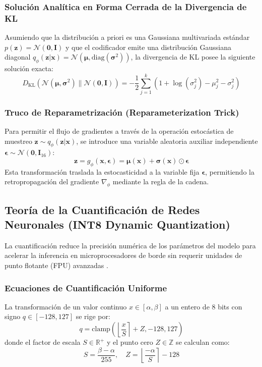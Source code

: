 \subsubsection{Solución Analítica en Forma Cerrada de la Divergencia de KL}
Asumiendo que la distribución a priori es una Gaussiana multivariada estándar $p(\mathbf{z}) = \mathcal{N}(\mathbf{0}, \mathbf{I})$ y que el codificador emite una distribución Gaussiana diagonal $q_\phi(\mathbf{z}|\mathbf{x}) = \mathcal{N}(\boldsymbol{\mu}, \text{diag}(\boldsymbol{\sigma}^2))$, la divergencia de KL posee la siguiente solución exacta:
\begin{equation}
D_{\text{KL}}\left( \mathcal{N}(\boldsymbol{\mu}, \boldsymbol{\sigma}^2) \parallel \mathcal{N}(\mathbf{0}, \mathbf{I}) \right) = -\frac{1}{2} \sum_{j=1}^k \left( 1 + \log(\sigma_j^2) - \mu_j^2 - \sigma_j^2 \right)
\end{equation}

\subsubsection{Truco de Reparametrización (Reparameterization Trick)}
Para permitir el flujo de gradientes a través de la operación estocástica de muestreo $\mathbf{z} \sim q_\phi(\mathbf{z}|\mathbf{x})$, se introduce una variable aleatoria auxiliar independiente $\boldsymbol{\epsilon} \sim \mathcal{N}(\mathbf{0}, \mathbf{I}_{16})$:
\begin{equation}
\mathbf{z} = g_\phi(\mathbf{x}, \boldsymbol{\epsilon}) = \boldsymbol{\mu}(\mathbf{x}) + \boldsymbol{\sigma}(\mathbf{x}) \odot \boldsymbol{\epsilon}
\end{equation}
Esta transformación traslada la estocasticidad a la variable fija $\boldsymbol{\epsilon}$, permitiendo la retropropagación del gradiente $\nabla_\phi$ mediante la regla de la cadena.

\subsection{Teoría de la Cuantificación de Redes Neuronales (INT8 Dynamic Quantization)}

La cuantificación reduce la precisión numérica de los parámetros del modelo para acelerar la inferencia en microprocesadores de borde sin requerir unidades de punto flotante (FPU) avanzadas \citep{zhang2024}.

\subsubsection{Ecuaciones de Cuantificación Uniforme}
La transformación de un valor continuo $x \in [\alpha, \beta]$ a un entero de 8 bits con signo $q \in [-128, 127]$ se rige por:
\begin{equation}
q = \text{clamp}\left( \left\lfloor \frac{x}{S} \right\rceil + Z, -128, 127 \right)
\end{equation}
donde el factor de escala $S \in \mathbb{R}^+$ y el punto cero $Z \in \mathbb{Z}$ se calculan como:
\begin{equation}
S = \frac{\beta - \alpha}{255}, \quad Z = \left\lfloor \frac{-\alpha}{S} \right\rceil - 128
\end{equation}

